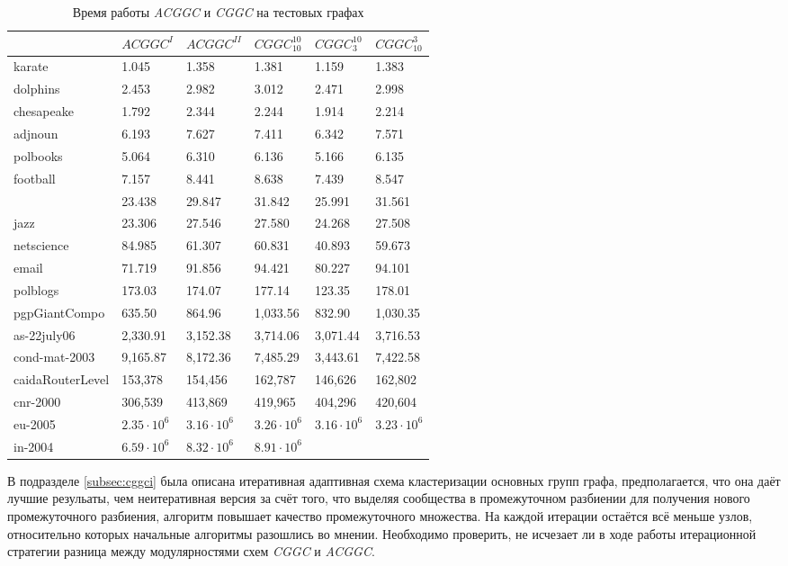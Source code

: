 \begin{table}[H]
	\caption{Время работы \emph{ACGGC} и \emph{CGGC} на тестовых графах}
	\label{tab:es-res-t}
	\begin{tabularx}{\textwidth}{XR{1.7cm}R{1.7cm}R{1.7cm}R{1.7cm}R{1.7cm}} \hline
				& $ACGGC^{I}$ & $ACGGC^{II}$ & $CGGC_{10}^{10}$	& $CGGC_{3}^{10}$ & $CGGC_{10}^{3}$ \\ \hline
	karate 			& 1.045 	& 1.358	 	& 1.381 	& 1.159		& 1.383		\\
	dolphins		& 2.453		& 2.982		& 3.012		& 2.471		& 2.998		\\
	chesapeake		& 1.792		& 2.344		& 2.244		& 1.914		& 2.214		\\
	adjnoun			& 6.193		& 7.627		& 7.411		& 6.342		& 7.571		\\
	polbooks		& 5.064		& 6.310		& 6.136		& 5.166		& 6.135		\\
	football		& 7.157		& 8.441		& 8.638		& 7.439		& 8.547		\\
	\celegans 		& 23.438	& 29.847	& 31.842	& 25.991	& 31.561	\\
	jazz			& 23.306	& 27.546	& 27.580	& 24.268	& 27.508	\\
	netscience		& 84.985	& 61.307	& 60.831	& 40.893	& 59.673	\\
	email			& 71.719	& 91.856	& 94.421	& 80.227	& 94.101	\\
	polblogs		& 173.03	& 174.07	& 177.14	& 123.35	& 178.01	\\
	pgpGiantCompo	& 635.50	& 864.96	& 1,033.56	& 832.90	& 1,030.35	\\
	as-22july06		& 2,330.91	& 3,152.38	& 3,714.06	& 3,071.44	& 3,716.53	\\
	cond-mat-2003	& 9,165.87	& 8,172.36	& 7,485.29	& 3,443.61	& 7,422.58	\\
	caidaRouterLevel& 153,378	& 154,456	& 162,787	& 146,626	& 162,802	\\
	cnr-2000		& 306,539	& 413,869	& 419,965	& 404,296	& 420,604	\\	
	eu-2005			& $2.35\cdot 10^6$	& $3.16\cdot 10^6$	& $3.26\cdot 10^6$	& $3.16\cdot 10^6$ & $3.23\cdot 10^6$ \\
	in-2004			& $6.59\cdot 10^6$	& $8.32\cdot 10^6$	& $8.91\cdot 10^6$	& 			& 			\\
	\hline
	\end{tabularx}
\end{table}

В подразделе \ref{subsec:cggci} была описана итеративная адаптивная схема кластеризации основных групп графа, предполагается, что она даёт лучшие резульаты, чем неитеративная версия за счёт того, что выделяя сообщества в промежуточном разбиении для получения нового промежуточного разбиения, алгоритм повышает качество промежуточного множества. На каждой итерации остаётся всё меньше узлов, относительно которых начальные алгоритмы разошлись во мнении. Необходимо проверить, не исчезает ли в ходе работы итерационной стратегии разница между модулярностями схем \emph{CGGC} и \emph{ACGGC}.

